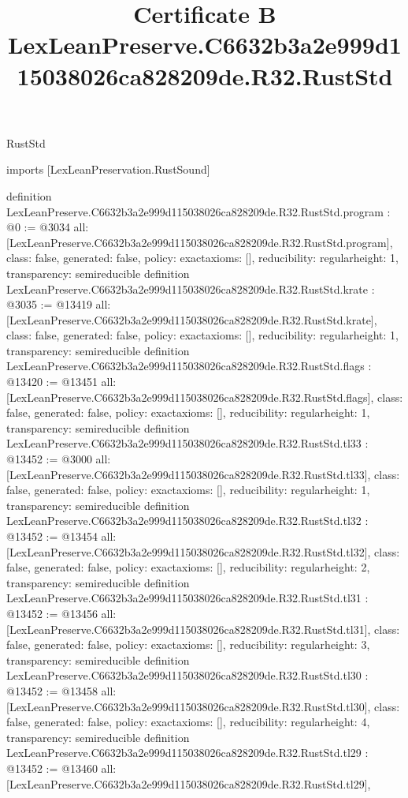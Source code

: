 \begin{lexlean}{RustStd}
\title{Certificate B LexLeanPreserve.C6632b3a2e999d115038026ca828209de.R32.RustStd}
\begin{coremodule}
imports [LexLeanPreservation.RustSound]

definition LexLeanPreserve.C6632b3a2e999d115038026ca828209de.R32.RustStd.program : @0 := @3034 {
  all: [LexLeanPreserve.C6632b3a2e999d115038026ca828209de.R32.RustStd.program],
  class: false,
  generated: false,
  policy: exact{axioms: []},
  reducibility: regular{height: 1},
  transparency: semireducible
}
definition LexLeanPreserve.C6632b3a2e999d115038026ca828209de.R32.RustStd.krate : @3035 := @13419 {
  all: [LexLeanPreserve.C6632b3a2e999d115038026ca828209de.R32.RustStd.krate],
  class: false,
  generated: false,
  policy: exact{axioms: []},
  reducibility: regular{height: 1},
  transparency: semireducible
}
definition LexLeanPreserve.C6632b3a2e999d115038026ca828209de.R32.RustStd.flags : @13420 := @13451 {
  all: [LexLeanPreserve.C6632b3a2e999d115038026ca828209de.R32.RustStd.flags],
  class: false,
  generated: false,
  policy: exact{axioms: []},
  reducibility: regular{height: 1},
  transparency: semireducible
}
definition LexLeanPreserve.C6632b3a2e999d115038026ca828209de.R32.RustStd.tl33 : @13452 := @3000 {
  all: [LexLeanPreserve.C6632b3a2e999d115038026ca828209de.R32.RustStd.tl33],
  class: false,
  generated: false,
  policy: exact{axioms: []},
  reducibility: regular{height: 1},
  transparency: semireducible
}
definition LexLeanPreserve.C6632b3a2e999d115038026ca828209de.R32.RustStd.tl32 : @13452 := @13454 {
  all: [LexLeanPreserve.C6632b3a2e999d115038026ca828209de.R32.RustStd.tl32],
  class: false,
  generated: false,
  policy: exact{axioms: []},
  reducibility: regular{height: 2},
  transparency: semireducible
}
definition LexLeanPreserve.C6632b3a2e999d115038026ca828209de.R32.RustStd.tl31 : @13452 := @13456 {
  all: [LexLeanPreserve.C6632b3a2e999d115038026ca828209de.R32.RustStd.tl31],
  class: false,
  generated: false,
  policy: exact{axioms: []},
  reducibility: regular{height: 3},
  transparency: semireducible
}
definition LexLeanPreserve.C6632b3a2e999d115038026ca828209de.R32.RustStd.tl30 : @13452 := @13458 {
  all: [LexLeanPreserve.C6632b3a2e999d115038026ca828209de.R32.RustStd.tl30],
  class: false,
  generated: false,
  policy: exact{axioms: []},
  reducibility: regular{height: 4},
  transparency: semireducible
}
definition LexLeanPreserve.C6632b3a2e999d115038026ca828209de.R32.RustStd.tl29 : @13452 := @13460 {
  all: [LexLeanPreserve.C6632b3a2e999d115038026ca828209de.R32.RustStd.tl29],
}
\end{coremodule}
\end{lexlean}
